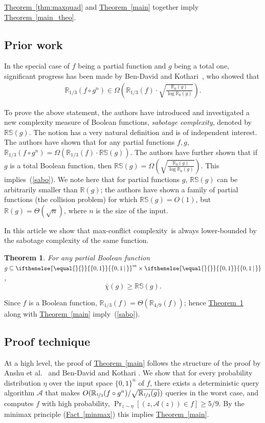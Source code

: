 \documentclass[11pt]{article}
\numberwithin{equation}{section}
\newtheorem{theorem}{Theorem}[section]
\theoremstyle{definition}
\theoremstyle{plain}
\newcommand{\R}{\mathbb R}
\newcommand{\expref}[2]{\hyperref[#2]{#1~\ref{#2}}}
\newcommand{\md}{\middle}
\newcommand{\dr}{\nicefrac}
\newcommand{\set}[2][]{\ifthenelse{\equal{}{#1}}%
{\ensuremath{\left\{#2\right\}}}%
{\ensuremath{\left\{#2\,\md|\,#1\right\}}}}
\newcommand{\OI}{\set{0,1}}
\newcommand{\RS}{\mathbb{RS}}
\newcommand{\ccc}{max-conflict complexity}
\begin{document}
\expref{Theorem}{thm:maxquad} and \expref{Theorem}{main} together imply \expref{Theorem}{main_theo}.

%
\subsection{Prior work}  %

In the special case of $f$ being a partial function and $g$ being a total one, significant progress has been made by Ben-David and Kothari~\cite{DBLP:conf/icalp/Ben-DavidK16}, who showed that
\begin{align}
	\R_{1/3}(f \circ g^n) \in 
	 \Omega \left(\R_{1/3}(f) \cdot \sqrt{\frac{\R_0(g)}{\log \R_0(g)}}\right).\label{sabo}
\end{align}

To prove the above statement, the authors have introduced and investigated a new complexity measure of Boolean functions, \emph{sabotage complexity}, denoted by $\RS(g)$. The notion has a very natural definition and is of independent interest. The authors have shown that for any partial functions $f,g$, $\R_{1/3}(f \circ g^n)=\Omega(\R_{1/3}(f) \cdot \RS(g))$. The authors have further shown that if $g$ is a total Boolean function, then $\RS(g)=\Omega\left(\sqrt{\frac{\R_0(g)}{\log \R_0(g)}}\right)$. This implies~(\ref{sabo}). We note here that for partial functions $g$, $\RS(g)$ can be arbitrarily smaller than $\R(g)$; the authors have shown a family of partial functions (the collision problem) for which $\RS(g)=O(1)$, but $\R(g)=\Theta(\sqrt{n})$, where $n$ is the size of the input.

In this %
article  %
we show that \ccc\ is always lower-bounded by the sabotage complexity of the same function.

\begin{theorem}
\label{sabotage}
For any partial Boolean function
%
$g \subseteq \OI^m \times \OI$,
\[\bar \chi(g) \ge \RS(g).\]
\end{theorem}
Since $f$ is a Boolean function, $\R_{1/3}(f)=\Theta(\R_{4/9}(f))$; hence \expref{Theorem}{sabotage} along with \expref{Theorem}{main} imply~(\ref{sabo}).
%
\subsection{Proof technique}
\label{idea}
At a high level, the proof of \expref{Theorem}{main} follows the structure of the proof by Anshu et al.\ \cite{fstcomp} and Ben-David and Kothari \cite{DBLP:conf/icalp/Ben-DavidK16}. We show that for every probability distribution $\eta$ over the 
input space $\{0,1\}^n$ of $f$, there exists a deterministic query algorithm $\mathcal{A}$ that makes $O(\R_{\dr13}(f \circ g^n)/\sqrt{\R_{\dr13}(g)})$ queries in the worst case, and computes $f$ with high probability, $\Pr_{z \sim \eta} [(z,\mathcal{A}(z))\in f] \geq 5/9$. By the minimax principle (\expref{Fact}{minmax}) this implies \expref{Theorem}{main}.
\end{document}
